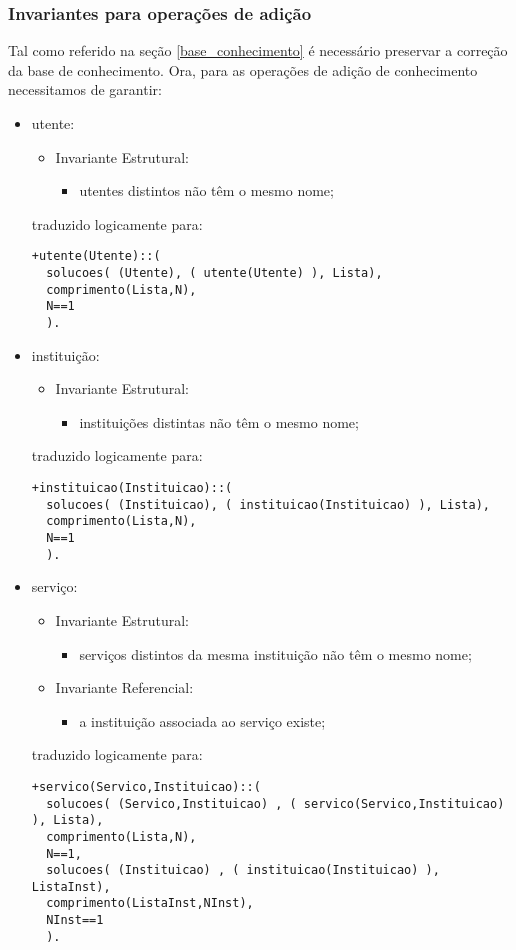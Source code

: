\documentclass[
  oneside,
  10pt, a4paper,
  footinclude=true,
  headinclude=true,
  cleardoublepage=empty
]{scrbook}
\begin{document}
\subsubsection{Invariantes para operações de adição}
\label{invariantes_adicao}
Tal como referido na seção \ref{base_conhecimento} é necessário preservar a correção da base de conhecimento. Ora, para as operações de adição de conhecimento necessitamos de garantir:
\begin{itemize}

\item   utente:
\begin{itemize}
\item        Invariante Estrutural:
\begin{itemize}
\item           utentes distintos não têm o mesmo nome;
\end{itemize}
\end{itemize}

traduzido logicamente para:
\begin{lstlisting}
+utente(Utente)::(
  solucoes( (Utente), ( utente(Utente) ), Lista),
  comprimento(Lista,N),
  N==1
  ).
\end{lstlisting}

\item   instituição:
\begin{itemize}
\item        Invariante Estrutural:
\begin{itemize}
\item         instituições distintas não têm o mesmo nome;
\end{itemize}
\end{itemize}
traduzido logicamente para:
\begin{lstlisting}
+instituicao(Instituicao)::(
  solucoes( (Instituicao), ( instituicao(Instituicao) ), Lista),
  comprimento(Lista,N),
  N==1
  ).
\end{lstlisting}

\item   serviço:
\begin{itemize}
\item        Invariante Estrutural:
\begin{itemize}
\item         serviços distintos da mesma instituição não têm o mesmo nome;
\end{itemize}
\item        Invariante Referencial:
\begin{itemize}
\item         a instituição associada ao serviço existe;
\end{itemize}
\end{itemize}
traduzido logicamente para:
\begin{lstlisting}
+servico(Servico,Instituicao)::(
  solucoes( (Servico,Instituicao) , ( servico(Servico,Instituicao) ), Lista),
  comprimento(Lista,N),
  N==1,
  solucoes( (Instituicao) , ( instituicao(Instituicao) ), ListaInst),
  comprimento(ListaInst,NInst),
  NInst==1
  ).
\end{lstlisting}


\end{itemize}
\end{document}
